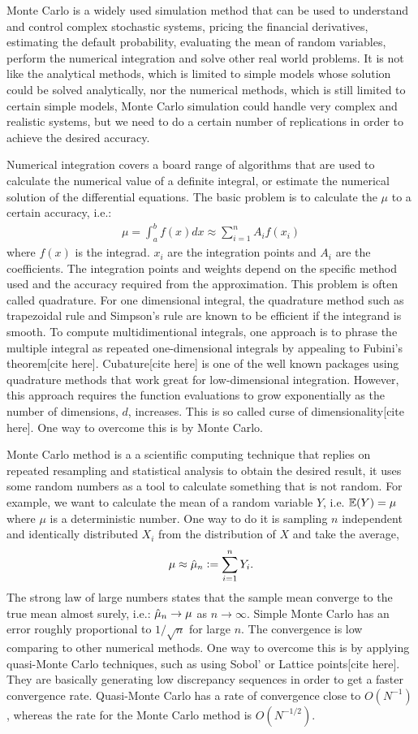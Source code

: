 \documentclass{iitthesis}
\begin{document}
Monte Carlo is a widely used simulation method that can be used to understand and control complex stochastic systems, pricing the financial derivatives, estimating the default probability, evaluating the mean of random variables, perform the numerical integration and solve other real world problems. It is not like the analytical methods, which is limited to simple models whose solution could be solved analytically, nor the numerical methods, which is still limited to certain simple models, Monte Carlo simulation could handle very complex and realistic systems, but we need to do a certain number of replications in order to achieve the desired accuracy.

Numerical integration covers a board range of algorithms that are used to calculate the numerical value of a definite integral, or estimate the numerical solution of the differential equations.
The basic problem is to calculate the $\mu$ to a certain accuracy, i.e.:
\begin{align}
\mu = \int_a^b f(x)dx \approx \sum_{i=1}^nA_i f(x_i)
\end{align}
where $f(x)$ is the integrad. $x_i$ are the integration points and $A_i$ are the coefficients. The integration points and weights depend on the specific method used and the accuracy required from the approximation.
This problem is often called quadrature. For one dimensional integral, the quadrature method such as trapezoidal rule and Simpson’s rule are known to be efficient if the integrand is smooth. To compute multidimentional integrals, one approach is to phrase the multiple integral as repeated one-dimensional integrals by appealing to Fubini's theorem[cite here]. Cubature[cite here] is one of the well known packages using quadrature methods that work great for low-dimensional integration. However, this approach requires the function evaluations to grow exponentially as the number of dimensions, $d$, increases. This is so called curse of dimensionality[cite here]. One way to overcome this is by Monte Carlo.

 Monte Carlo method is a a scientific computing technique that replies on repeated resampling and statistical analysis to obtain the desired result, it uses some random numbers as a tool to calculate something that is not random. For example, we want to calculate the mean of a random variable $Y$, i.e. $\mathbb{E}(Y) = \mu$ where $\mu$ is a deterministic number.  One way to do it is sampling $n$ independent and identically distributed $X_i$ from the distribution of $X$ and take the average,
$$\mu \approx \hat{\mu}_n := \sum_{i=1}^nY_i.$$
The strong law of large numbers states that the sample mean converge to the true mean almost surely, i.e.: $\hat{\mu}_n \to \mu$ as $n \to \infty$. Simple Monte Carlo has an error roughly proportional to $1/\sqrt{n}$ for large $n$. The convergence is low comparing to other numerical methods. One way to overcome this is by applying quasi-Monte Carlo techniques, such as using Sobol' or Lattice points[cite here]. They are basically generating low discrepancy sequences in order to get a faster convergence rate. Quasi-Monte Carlo has a rate of convergence close to $O(N^{-1})$, whereas the rate for the Monte Carlo method is $O(N^{-1/2})$.
\end{document}
